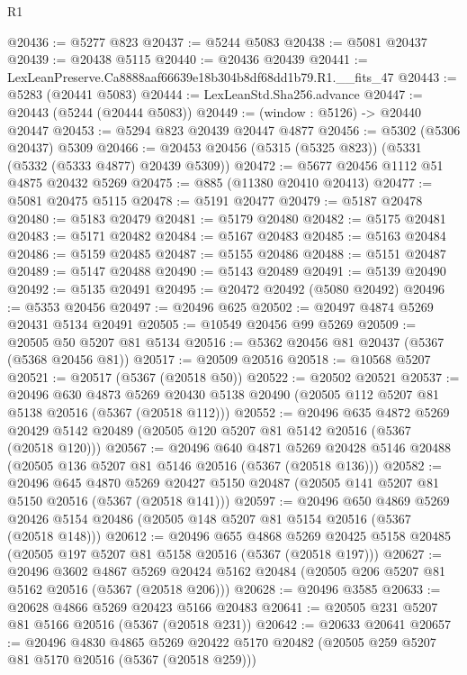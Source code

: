 \begin{lexlean}{R1}
\begin{coremodule}
@20436 := @5277 @823
@20437 := @5244 @5083
@20438 := @5081 @20437
@20439 := @20438 @5115
@20440 := @20436 @20439
@20441 := LexLeanPreserve.Ca8888aaf66639e18b304b8df68dd1b79.R1.__fits_47
@20443 := @5283 (@20441 @5083)
@20444 := LexLeanStd.Sha256.advance
@20447 := @20443 (@5244 (@20444 @5083))
@20449 := (window : @5126) -> @20440 @20447
@20453 := @5294 @823 @20439 @20447 @4877
@20456 := @5302 (@5306 @20437) @5309
@20466 := @20453 @20456 (@5315 (@5325 @823)) (@5331 (@5332 (@5333 @4877) @20439 @5309))
@20472 := @5677 @20456 @1112 @51 @4875 @20432 @5269
@20475 := @885 (@11380 @20410 @20413)
@20477 := @5081 @20475 @5115
@20478 := @5191 @20477
@20479 := @5187 @20478
@20480 := @5183 @20479
@20481 := @5179 @20480
@20482 := @5175 @20481
@20483 := @5171 @20482
@20484 := @5167 @20483
@20485 := @5163 @20484
@20486 := @5159 @20485
@20487 := @5155 @20486
@20488 := @5151 @20487
@20489 := @5147 @20488
@20490 := @5143 @20489
@20491 := @5139 @20490
@20492 := @5135 @20491
@20495 := @20472 @20492 (@5080 @20492)
@20496 := @5353 @20456
@20497 := @20496 @625
@20502 := @20497 @4874 @5269 @20431 @5134 @20491
@20505 := @10549 @20456 @99 @5269
@20509 := @20505 @50 @5207 @81 @5134
@20516 := @5362 @20456 @81 @20437 (@5367 (@5368 @20456 @81))
@20517 := @20509 @20516
@20518 := @10568 @5207
@20521 := @20517 (@5367 (@20518 @50))
@20522 := @20502 @20521
@20537 := @20496
    @630
    @4873
    @5269
    @20430
    @5138
    @20490
    (@20505 @112 @5207 @81 @5138 @20516 (@5367 (@20518 @112)))
@20552 := @20496
    @635
    @4872
    @5269
    @20429
    @5142
    @20489
    (@20505 @120 @5207 @81 @5142 @20516 (@5367 (@20518 @120)))
@20567 := @20496
    @640
    @4871
    @5269
    @20428
    @5146
    @20488
    (@20505 @136 @5207 @81 @5146 @20516 (@5367 (@20518 @136)))
@20582 := @20496
    @645
    @4870
    @5269
    @20427
    @5150
    @20487
    (@20505 @141 @5207 @81 @5150 @20516 (@5367 (@20518 @141)))
@20597 := @20496
    @650
    @4869
    @5269
    @20426
    @5154
    @20486
    (@20505 @148 @5207 @81 @5154 @20516 (@5367 (@20518 @148)))
@20612 := @20496
    @655
    @4868
    @5269
    @20425
    @5158
    @20485
    (@20505 @197 @5207 @81 @5158 @20516 (@5367 (@20518 @197)))
@20627 := @20496
    @3602
    @4867
    @5269
    @20424
    @5162
    @20484
    (@20505 @206 @5207 @81 @5162 @20516 (@5367 (@20518 @206)))
@20628 := @20496 @3585
@20633 := @20628 @4866 @5269 @20423 @5166 @20483
@20641 := @20505 @231 @5207 @81 @5166 @20516 (@5367 (@20518 @231))
@20642 := @20633 @20641
@20657 := @20496
    @4830
    @4865
    @5269
    @20422
    @5170
    @20482
    (@20505 @259 @5207 @81 @5170 @20516 (@5367 (@20518 @259)))

\end{coremodule}
\end{lexlean}
